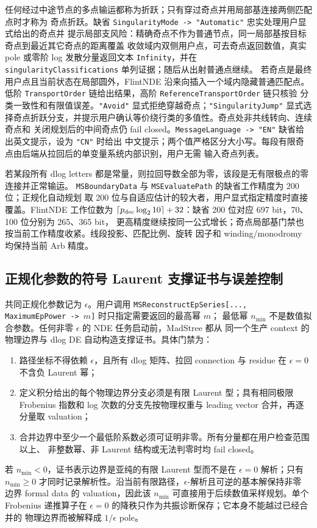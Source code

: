 \documentclass[11pt,a4paper]{ctexart}
\begin{document}
任何经过中途节点的多点输运都称为折跃；只有穿过奇点并用局部基连接两侧匹配点时才称为
奇点折跃。缺省 \texttt{SingularityMode -> "Automatic"} 忠实处理用户显式给出的奇点并
提示局部支风险：精确奇点不作为普通节点，同一局部基按目标奇点到最近其它奇点的距离覆盖
收敛域内双侧用户点，可去奇点返回数值，真实 pole 或零阶 log 发散分量返回文本
\texttt{Infinity}，并在 \texttt{singularityClassifications} 单列证据；随后从出射普通点继续。
若奇点是最终用户点且当前状态在局部圆外，FlintNDE 沿来向插入一个域内隐藏普通匹配点。
低阶 \texttt{TransportOrder} 链给出结果，高阶 \texttt{ReferenceTransportOrder} 链只核验
分类一致性和有限值误差。\texttt{"Avoid"} 显式拒绝穿越奇点；\texttt{"SingularityJump"}
显式选择奇点折跃分支，并提示用户确认等价绕行类的多值性。奇点处非共线转向、连续奇点和
关闭规划后的中间奇点仍 fail closed。\texttt{MessageLanguage -> "EN"} 缺省给出英文提示，设为 \texttt{"CN"} 时给出
中文提示；两个值严格区分大小写。每段有限奇点由后端从拉回后的单变量系统内部识别，用户无需
输入奇点列表。

若某段所有 dlog letters 都是常量，则拉回导数全部为零，该段是无有限极点的零连接并正常输运。
\texttt{MSBoundaryData} 与 \texttt{MSEvaluatePath} 的缺省工作精度为 200 位；正规化自动规划
取 200 位与自适应估计的较大者，用户显式指定精度时直接覆盖。FlintNDE 工作位数为
$\lceil p_{\rm dec}\log_2 10\rceil+32$：缺省 200 位对应 697 bit，70、100 位分别为 265、365 bit，
更高精度继续按同一公式增长；奇点局部基门禁也按当前工作精度收紧。线段投影、匹配比例、旋转
因子和 winding/monodromy 均保持当前 Arb 精度。

\subsection{正规化参数的符号 Laurent 支撑证书与误差控制}

共同正规化参数记为 $\epsilon$。用户调用
\texttt{MSReconstructEpSeries[..., MaximumEpPower -> $m$]} 时只指定需要返回的最高幂 $m$；
最低幂 $n_{\min}$ 不是数值拟合参数。任何非零 $\epsilon$ 的 NDE 任务启动前，MadStree 都从
同一个生产 context 的物理边界与 dlog DE 自动构造支撑证书。具体门禁为：
\begin{enumerate}[label=\arabic*.]
  \item 路径坐标不得依赖 $\epsilon$，且所有 dlog 矩阵、拉回 connection 与 residue 在
  $\epsilon=0$ 不含负 Laurent 幂；
  \item 定义积分给出的每个物理边界分支必须是有限 Laurent 型；具有相同极限 Frobenius
  指数和 log 次数的分支先按物理权重与 leading vector 合并，再逐分量取 valuation；
  \item 合并边界中至少一个最低阶系数必须可证明非零。所有分量都在用户检查范围以上、
  非整数幂、非 Laurent 结构或无法判零时均 fail closed。
\end{enumerate}
若 $n_{\min}<0$，证书表示边界是亚纯的有限 Laurent 型而不是在 $\epsilon=0$ 解析；只有
$n_{\min}\geq0$ 才同时记录解析性。沿当前有限路径，$\epsilon$-解析且可逆的基本解保持非零
边界 formal data 的 valuation，因此该 $n_{\min}$ 可直接用于后续数值采样规划。单个
Frobenius 递推算子在 $\epsilon=0$ 的降秩只作为共振诊断保存；它本身不能越过已经合并的
物理边界而被解释成 $1/\epsilon$ pole。
\end{document}
